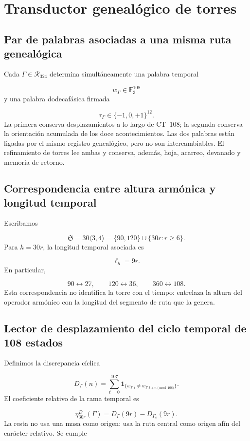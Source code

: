 \section{Transductor genealógico de torres}
\subsection{Par de palabras asociadas a una misma ruta genealógica}
Cada \(\Gamma\in\mathcal R_{324}\) determina simultáneamente una palabra temporal

\[
 w_\Gamma\in\mathbb F_3^{108}
\]
y una palabra dodecafásica firmada

\[
 \tau_\Gamma\in\{-1,0,+1\}^{12}.
\]
La primera conserva desplazamientos a lo largo de CT--108; la segunda conserva la orientación acumulada de los doce acontecimientos. Las dos palabras están ligadas por el mismo registro genealógico, pero no son intercambiables. El refinamiento de torres lee ambas y conserva, además, hoja, acarreo, devanado y memoria de retorno.

\subsection{Correspondencia entre altura armónica y longitud temporal}
Escribamos

\[
 \mathfrak S=30\langle3,4\rangle
 =\{90,120\}\cup\{30r:r\ge6\}.
\]
Para \(h=30r\), la longitud temporal asociada es

\[
 \ell_h=9r.
\]
En particular,

\[
 90\longleftrightarrow27,\qquad
 120\longleftrightarrow36,\qquad
 360\longleftrightarrow108.
\]
Esta correspondencia no identifica la torre con el tiempo: entrelaza la altura del operador armónico con la longitud del segmento de ruta que la genera.

\subsection{Lector de desplazamiento del ciclo temporal de 108 estados}
Definimos la discrepancia cíclica

\[
 D_\Gamma(n)=
 \sum_{t=0}^{107}
 \mathbf1_{\{w_{\Gamma,t}\ne
 w_{\Gamma,t+n\!\!\!\pmod{108}}\}}.
\]
El coeficiente relativo de la rama temporal es

\[
 \boxed{\eta_{30r}^{D}(\Gamma)
 =D_\Gamma(9r)-D_{\Gamma_e}(9r).}
\]
La resta no usa una masa como origen: usa la ruta central como origen afín del carácter relativo. Se cumple

